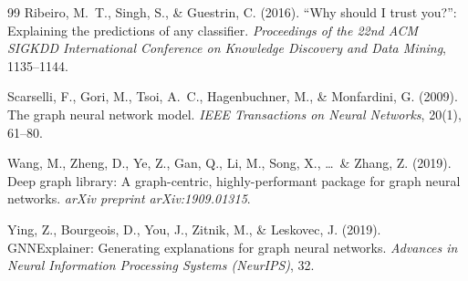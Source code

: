 ﻿\documentclass[a4paper,12pt]{article}
\theoremstyle{definition}
\begin{document}
\begin{thebibliography}{99}
Ribeiro, M.~T., Singh, S., \& Guestrin, C. (2016).
``Why should I trust you?'': Explaining the predictions of any classifier.
\emph{Proceedings of the 22nd ACM SIGKDD International Conference on Knowledge
Discovery and Data Mining}, 1135--1144.

Scarselli, F., Gori, M., Tsoi, A.~C., Hagenbuchner, M., \& Monfardini, G. (2009).
The graph neural network model.
\emph{IEEE Transactions on Neural Networks}, 20(1), 61--80.

Wang, M., Zheng, D., Ye, Z., Gan, Q., Li, M., Song, X., \ldots\ \& Zhang, Z. (2019).
Deep graph library: A graph-centric, highly-performant package for graph neural networks.
\emph{arXiv preprint arXiv:1909.01315}.

Ying, Z., Bourgeois, D., You, J., Zitnik, M., \& Leskovec, J. (2019).
GNNExplainer: Generating explanations for graph neural networks.
\emph{Advances in Neural Information Processing Systems (NeurIPS)}, 32.

\end{thebibliography}
\end{document}
